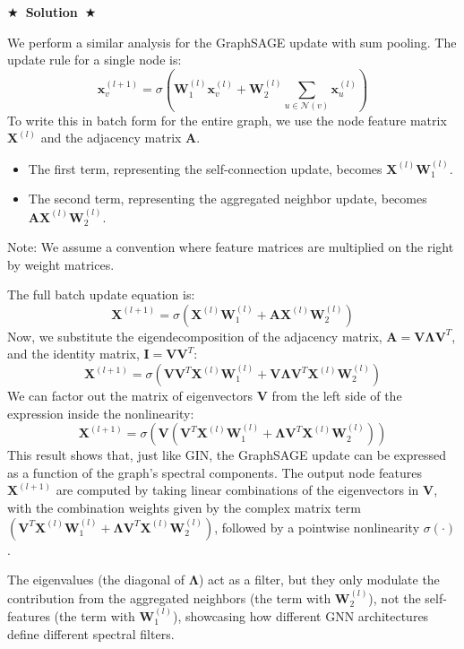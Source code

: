 \documentclass{article}
\numberwithin{figure}{section}
\newcommand{\Solution}[1]{%
    {%
        \medskip
        \color{red}
        \bf $\bigstar$~\sf\textbf{Solution}~$\bigstar$ \sf
        #1
    }
    \bigskip
}
\begin{document}
\Solution{
	We perform a similar analysis for the GraphSAGE update with sum pooling. The update rule for a single node is:
	\[ \mathbf{x}_v^{(l+1)} = \sigma \left(\mathbf{W}_1^{(l)} \mathbf{x}_v^{(l)} + \mathbf{W}_2^{(l)} \sum_{u \in \mathcal{N}(v)}\mathbf{x}_u^{(l)} \right) \]
	To write this in batch form for the entire graph, we use the node feature matrix $\mathbf{X}^{(l)}$ and the adjacency matrix $\mathbf{A}$.
	\begin{itemize}
		\item The first term, representing the self-connection update, becomes $\mathbf{X}^{(l)}\mathbf{W}_1^{(l)}$.
		\item The second term, representing the aggregated neighbor update, becomes $\mathbf{A}\mathbf{X}^{(l)}\mathbf{W}_2^{(l)}$.
	\end{itemize}
	Note: We assume a convention where feature matrices are multiplied on the right by weight matrices.
	
	The full batch update equation is:
	\[ \mathbf{X}^{(l+1)} = \sigma\left( \mathbf{X}^{(l)}\mathbf{W}_1^{(l)} + \mathbf{A}\mathbf{X}^{(l)}\mathbf{W}_2^{(l)} \right) \]
	Now, we substitute the eigendecomposition of the adjacency matrix, $\mathbf{A}=\mathbf{V}\mathbf{\Lambda}\mathbf{V}^T$, and the identity matrix, $\mathbf{I} = \mathbf{V}\mathbf{V}^T$:
	\[ \mathbf{X}^{(l+1)} = \sigma\left( \mathbf{V}\mathbf{V}^T\mathbf{X}^{(l)}\mathbf{W}_1^{(l)} + \mathbf{V}\mathbf{\Lambda}\mathbf{V}^T\mathbf{X}^{(l)}\mathbf{W}_2^{(l)} \right) \]
	We can factor out the matrix of eigenvectors $\mathbf{V}$ from the left side of the expression inside the nonlinearity:
	\[ \mathbf{X}^{(l+1)} = \sigma\left( \mathbf{V} \left( \mathbf{V}^T\mathbf{X}^{(l)}\mathbf{W}_1^{(l)} + \mathbf{\Lambda}\mathbf{V}^T\mathbf{X}^{(l)}\mathbf{W}_2^{(l)} \right) \right) \]
	This result shows that, just like GIN, the GraphSAGE update can be expressed as a function of the graph's spectral components. The output node features $\mathbf{X}^{(l+1)}$ are computed by taking linear combinations of the eigenvectors in $\mathbf{V}$, with the combination weights given by the complex matrix term $\left( \mathbf{V}^T\mathbf{X}^{(l)}\mathbf{W}_1^{(l)} + \mathbf{\Lambda}\mathbf{V}^T\mathbf{X}^{(l)}\mathbf{W}_2^{(l)} \right)$, followed by a pointwise nonlinearity $\sigma(\cdot)$.
	
	The eigenvalues (the diagonal of $\mathbf{\Lambda}$) act as a filter, but they only modulate the contribution from the aggregated neighbors (the term with $\mathbf{W}_2^{(l)}$), not the self-features (the term with $\mathbf{W}_1^{(l)}$), showcasing how different GNN architectures define different spectral filters.
}
\end{document}
